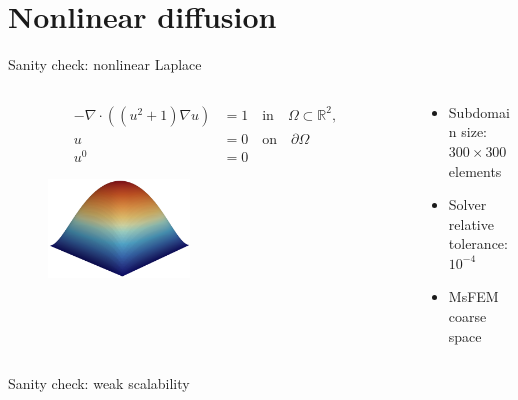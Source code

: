 \section{Nonlinear diffusion}
\begin{frame}[noframenumbering]{Sanity check: nonlinear Laplace}
    \begin{columns}
        \begin{column}{0.47\textwidth}
                \begin{align*}
                    -\nabla\cdot((u^2+1)\nabla u)&=1\quad \text{in}\quad \Omega\subset\mathbb{R}^2,\\
                    u &= 0\quad\text{on}\quad\partial\Omega\\
                    u^0 &= 0
                \end{align*}
                \begin{figure}
                    \centering
                    \includegraphics[width=0.45\textwidth]{images/laplace}
                \end{figure}
        \end{column}
        \begin{column}{0.53\textwidth}
               \begin{itemize}
                \setlength{\itemsep}{10pt}
                \item Subdomain size: $300\times300$ elements
                \item Solver relative tolerance: $10^{-4}$
                \item MsFEM coarse space
               \end{itemize} 
        \end{column}
    \end{columns}
 \end{frame}
 
 \begin{frame}[noframenumbering]{Sanity check: weak scalability}
  \begin{figure}
      \centering
      
  \end{figure}
 \end{frame}
